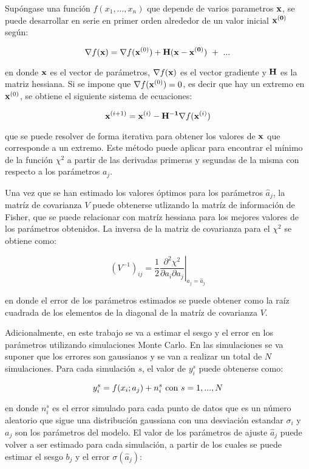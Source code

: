 \documentclass{article}
\begin{document}
Supóngase una función \(f(x_1,...,x_n)\) que depende de varios
parametros \(\bf{x}\), se puede desarrollar en serie en primer orden
alrededor de un valor inicial \(\bf{x^{(0)}}\) según:

\[\nabla f({\bf{x}}) = \nabla f ({\bf{x}}^{(0)}) 
+ \bf{H}({\bf{x}}- {\bf{x}}^{(0)}) ~+~ ... \]

en donde \(\bf{x}\) es el vector de parámetros, \(\nabla f({\bf{x}})\)
es el vector gradiente y \(\bf{H}\) es la matriz hessiana. Si se impone
que \(\nabla f ({\bf{x}}^{(0)}) = 0\), es decir que hay un extremo en
\({\bf{x}}^{(0)}\), se obtiene el siguiente sistema de ecuaciones:

\[{\bf{x}}^{(i+1)} = {\bf{x}}^{(i)} - {\bf{H}^{-1}}\nabla f ({\bf{x}}^{(i)})\]

que se puede resolver de forma iterativa para obtener los valores de
\({\bf{x}}\) que corresponde a un extremo. Este método puede aplicar
para encontrar el mínimo de la función \(\chi^2\) a partir de las
derivadas primeras y segundas de la misma con respecto a los parámetros
\(a_j\).

Una vez que se han estimado los valores óptimos para los parámetros
\(\hat{a}_j\), la matríz de covarianza \(V\) puede obtenerse utlizando
la matríz de información de Fisher, que se puede relacionar con matríz
hessiana para los mejores valores de los parámetros obtenidos. La
inversa de la matriz de covarianza para el \(\chi^2\) se obtiene como:

\[(V^{-1})_{ij} = \left. \frac{1}{2} \frac{\partial^2 \chi^2 }{\partial a_i \partial a_j } \right|_{a_j = \hat{a}_j}\]

en donde el error de los parámetros estimados se puede obtener como la
raíz cuadrada de los elementos de la diagonal de la matríz de covarianza
\(V\).

Adicionalmente, en este trabajo se va a estimar el sesgo y el error en
los parámetros utilizando simulaciones Monte Carlo. En las simulaciones
se va suponer que los errores son gaussianos y se van a realizar un
total de \(N\) simulaciones. Para cada simulación \(s\), el valor de
\(y_i^s\) puede obtenerse como:

\[y_i^s = f(x_i;a_j) + n_i^s ~{\rm{con}}~ s=1,...,N\]

en donde \(n_i^s\) es el error simulado para cada punto de datos que es
un número aleatorio que sigue una distribución gaussiana con una
desviación estandar \(\sigma_i\) y \(a_j\) son los parámetros del
modelo. El valor de los parámetros de ajuste \(\hat{a}_j\) puede volver
a ser estimado para cada simulación, a partir de los cuales se puede
estimar el sesgo \(b_j\) y el error \(\sigma({\hat{a}_j})\):
\end{document}

